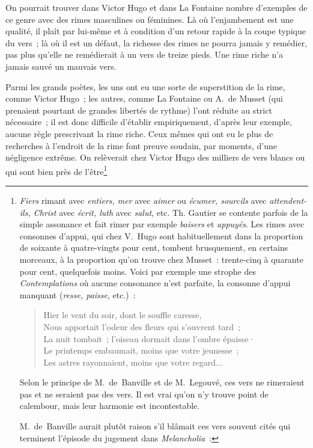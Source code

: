 \documentclass[french,twoside]{book} %
\begin{document}
\noindent On pourrait trouver dans Victor Hugo et dans La Fontaine nombre d’exemples de ce genre avec des rimes masculines ou féminines. Là où l’enjambement est une qualité, il plaît par lui-même et à condition d’un retour rapide à la coupe typique du vers ; là où il est un défaut, la richesse des rimes ne pourra jamais y remédier, pas plus qu’elle ne remédierait à un vers de treize pieds. Une rime riche n’a jamais sauvé un mauvais vers.\par
Parmi les grands poètes, les uns ont eu une sorte de superstition de la rime, comme Victor Hugo ; les autres, comme La Fontaine ou A. de Musset (qui prenaient pourtant de grandes libertés de rythme) l’ont réduite au strict  nécessaire ; il est donc difficile d’établir empiriquement, d’après leur exemple, aucune règle prescrivant la rime riche. Ceux mêmes qui ont eu le plus de recherches à l’endroit de la rime font preuve soudain, par moments, d’une négligence extrême. On relèverait chez Victor Hugo des milliers de vers blancs ou qui sont bien près de l’être\footnote{\noindent \emph{Fiers} rimant avec \emph{entiers, mer} avec \emph{aimer} ou \emph{écumer, sourcils} avec \emph{attendent-ils, Christ} avec \emph{écrit, luth} avec \emph{salut}, etc. Th. Gautier se contente parfois de la simple assonance et fait rimer par exemple \emph{baisers} et \emph{appuyés}. Les rimes avec consonnes d’appui, qui chez V. Hugo sont habituellement dans la proportion de soixante à quatre-vingts pour cent, tombent brusquement, en certains morceaux, à la proportion qu’on trouve chez Musset : trente-cinq à quarante pour cent, quelquefois moins. Voici par exemple une strophe des \emph{Contemplations} où aucune consonance n’est parfaite, la consonne d’appui manquant (\emph{resse, paisse}, etc.) :\par

\begin{verse}
Hier le vent du soir, dont le souffle caresse,\\
Nous apportait l’odeur des fleurs qui s’ouvrent tard ;\\
La nuit tombait ; l’oiseau dormait dans l’ombre épaisse·\\
Le printemps embaumait, moins que votre jeunesse ;\\
Les astres rayonnaient, moins que votre regard...\\
\end{verse}
\par
\noindent Selon le principe de M. de Banville et de M. Legouvé, ces vers ne rimeraient pas et ne seraient pas des vers. Il est vrai qu’on n’y trouve point de calembour, mais leur harmonie est incontestable.\par
M. de Banville aurait plutôt raison s’il blâmait ces vers souvent cités qui terminent l’épisode du jugement dans \emph{Melancholia} :\par

}
\end{document}
